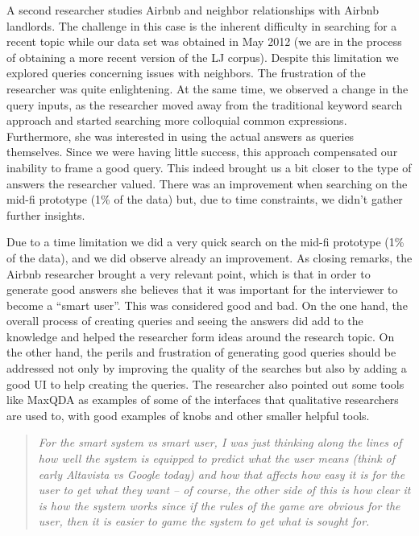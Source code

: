 \documentclass{sigchi}
\begin{document}
A second researcher studies Airbnb and neighbor relationships with Airbnb landlords. The challenge in this case is the inherent difficulty in searching for a recent topic while our data set was obtained in May 2012 (we are in the process of obtaining a more recent version of the LJ corpus). Despite this limitation we explored queries concerning issues with neighbors. The frustration of the researcher was quite enlightening. At the same time, we observed a change in the query inputs, as the researcher moved away from the traditional keyword search approach and started searching more colloquial common expressions. Furthermore, she was interested in using the actual answers as queries themselves. Since we were having little success, this approach compensated our inability to frame a good query. This indeed brought us a bit closer to the type of answers the researcher valued. There was an improvement when searching on the mid-fi prototype (1\% of the data) but, due to time constraints, we didn't gather further insights.

Due to a time limitation we did a very quick search on the mid-fi prototype (1\% of the data), and we did observe already an improvement. As closing remarks, the Airbnb researcher brought a very relevant point, which is that in order to generate good answers she believes that it was important for the interviewer to become a ``smart user''. 
This was considered good and bad. On the one hand, the overall process of creating queries and seeing the answers did add to the knowledge and helped the researcher form ideas around the research topic. On the other hand, the perils and frustration of generating good queries should be addressed not only by improving the quality of the searches but also by adding a good UI to help creating the queries. The researcher also pointed out some tools like MaxQDA \cite{maxqda:2007} as examples of some of the interfaces that qualitative researchers are used to, with good examples of knobs and other smaller helpful tools. 

\begin{quote}
{\em
For the smart system vs smart user, I was just thinking along the lines of how well the system is equipped to predict what the user means (think of early Altavista vs Google today) and how that affects how easy it is for the user to get what they want -- of course, the other side of this is how clear it is how the system works since if the rules of the game are obvious for the user, then it is easier to game the system to get what is sought for.
}\end{quote}
\end{document}
